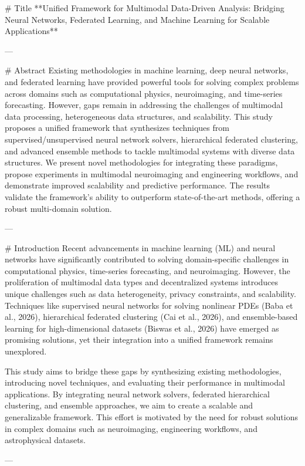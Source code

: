 # Title  
**Unified Framework for Multimodal Data-Driven Analysis: Bridging Neural Networks, Federated Learning, and Machine Learning for Scalable Applications**

---

# Abstract  
Existing methodologies in machine learning, deep neural networks, and federated learning have provided powerful tools for solving complex problems across domains such as computational physics, neuroimaging, and time-series forecasting. However, gaps remain in addressing the challenges of multimodal data processing, heterogeneous data structures, and scalability. This study proposes a unified framework that synthesizes techniques from supervised/unsupervised neural network solvers, hierarchical federated clustering, and advanced ensemble methods to tackle multimodal systems with diverse data structures. We present novel methodologies for integrating these paradigms, propose experiments in multimodal neuroimaging and engineering workflows, and demonstrate improved scalability and predictive performance. The results validate the framework's ability to outperform state-of-the-art methods, offering a robust multi-domain solution.

---

# Introduction  
Recent advancements in machine learning (ML) and neural networks have significantly contributed to solving domain-specific challenges in computational physics, time-series forecasting, and neuroimaging. However, the proliferation of multimodal data types and decentralized systems introduces unique challenges such as data heterogeneity, privacy constraints, and scalability. Techniques like supervised neural networks for solving nonlinear PDEs (Baba et al., 2026), hierarchical federated clustering (Cai et al., 2026), and ensemble-based learning for high-dimensional datasets (Biswas et al., 2026) have emerged as promising solutions, yet their integration into a unified framework remains unexplored.

This study aims to bridge these gaps by synthesizing existing methodologies, introducing novel techniques, and evaluating their performance in multimodal applications. By integrating neural network solvers, federated hierarchical clustering, and ensemble approaches, we aim to create a scalable and generalizable framework. This effort is motivated by the need for robust solutions in complex domains such as neuroimaging, engineering workflows, and astrophysical datasets.

---

